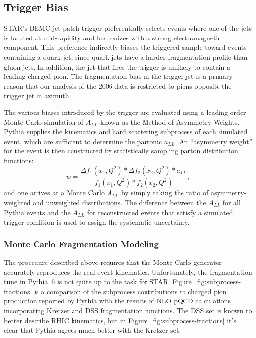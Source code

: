 \subsection{Trigger Bias}

STAR's BEMC jet patch trigger preferentially selects events where one of the
jets is located at mid-rapidity and hadronizes with a strong electromagnetic
component. This preference indirectly biases the triggered sample toward events
containing a quark jet, since quark jets have a harder fragmentation profile
than gluon jets. In addition, the jet that fires the trigger is unlikely to
contain a leading charged pion. The fragmentation bias in the trigger jet is a
primary reason that our analysis of the 2006 data is restricted to pions
opposite the trigger jet in azimuth.

The various biases introduced by the trigger are evaluated using a leading-order
Monte Carlo simulation of \(A_{LL}\) known as the Method of Asymmetry Weights.
Pythia supplies the kinematics and hard scattering subprocess of each simulated
event, which are sufficient to determine the partonic \(a_{LL}\). An ``asymmetry weight'' for the event is then constructed by
statistically sampling parton distribution functions:
%
\begin{equation}
  w = \frac{\Delta f_1(x_1, Q^2) * \Delta f_2(x_2, Q^2) * a_{LL}}{f_1(x_1, Q^2) * f_2(x_2, Q^2)},
\end{equation}
%
and one arrives at a Monte Carlo \(A_{LL}\) by simply taking the ratio of
asymmetry-weighted and unweighted distributions. The difference between the
\(A_{LL}\) for all Pythia events and the \(A_{LL}\) for reconstructed events
that satisfy a simulated trigger condition is used to assign the systematic
uncertainty.

\subsubsection{Monte Carlo Fragmentation Modeling}

The procedure described above requires that the Monte Carlo generator accurately
reproduces the real event kinematics. Unfortunately, the fragmentation tune in
Pythia~6 is not quite up to the task for STAR.
Figure~\ref{fig:subprocess-fractions} is a comparison of the subprocess
contributions to charged pion production reported by Pythia with the results of
NLO pQCD calculations incorporating Kretzer and DSS fragmentation functions. The
DSS set is known to better describe RHIC kinematics, but in
Figure~\ref{fig:subprocess-fractions} it's clear that Pythia agrees much better
with the Kretzer set.

